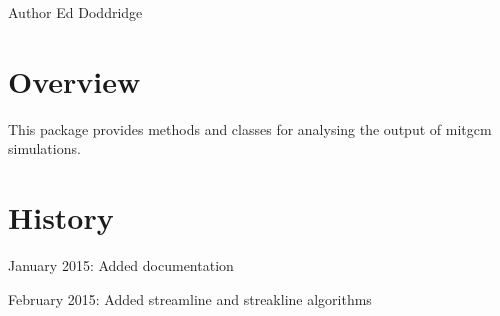 \begin{DoxyAuthor}{Author}
Ed Doddridge
\end{DoxyAuthor}
\hypertarget{index_Overview}{}\section{Overview}\label{index_Overview}
This package provides methods and classes for analysing the output of mitgcm simulations.\hypertarget{index_Revision}{}\section{History}\label{index_Revision}
January 2015\+: Added documentation

February 2015\+: Added streamline and streakline algorithms 